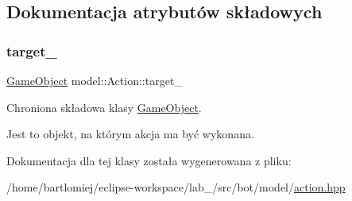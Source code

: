\subsection{Dokumentacja atrybutów składowych}
\mbox{\label{classmodel_1_1Action_aaa02d0e5308513cd6832c6cd1ac7157f}} 
\subsubsection{\texorpdfstring{target\+\_\+}{target\_}}
{\footnotesize\ttfamily \hyperlink{classmodel_1_1GameObject}{Game\+Object} model\+::\+Action\+::target\+\_\+\hspace{0.3cm}{\ttfamily [protected]}}



Chroniona składowa klasy \hyperlink{classmodel_1_1GameObject}{Game\+Object}. 

Jest to objekt, na którym akcja ma być wykonana. 

Dokumentacja dla tej klasy została wygenerowana z pliku\+:\begin{DoxyCompactItemize}
\item 
/home/bartlomiej/eclipse-\/workspace/lab\+\_/src/bot/model/\hyperlink{action_8hpp}{action.\+hpp}\end{DoxyCompactItemize}
